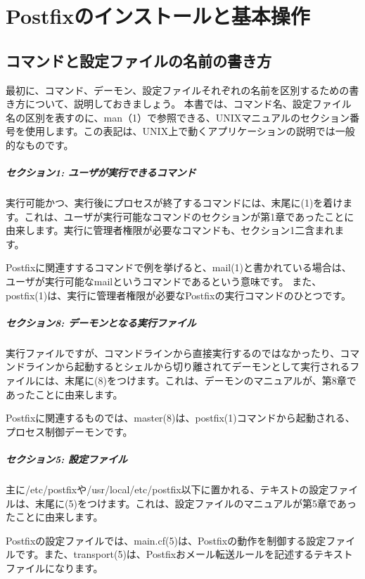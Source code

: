 \chapter{Postfixのインストールと基本操作}

\section{コマンドと設定ファイルの名前の書き方}
最初に、コマンド、デーモン、設定ファイルそれぞれの名前を区別するための書き方について、説明しておきましょう。
本書では、コマンド名、設定ファイル名の区別を表すのに、man（1）で参照できる、UNIXマニュアルのセクション番号を使用します。この表記は、UNIX上で動くアプリケーションの説明では一般的なものです。

\paragraph{セクション1: ユーザが実行できるコマンド}
実行可能かつ、実行後にプロセスが終了するコマンドには、末尾に(1)を着けます。これは、ユーザが実行可能なコマンドのセクションが第1章であったことに由来します。実行に管理者権限が必要なコマンドも、セクション1二含まれます。

Postfixに関連すするコマンドで例を挙げると、mail(1)と書かれている場合は、ユーザが実行可能なmailというコマンドであるという意味です。
また、postfix(1)は、実行に管理者権限が必要なPostfixの実行コマンドのひとつです。

\paragraph{セクション8: デーモンとなる実行ファイル}
実行ファイルですが、コマンドラインから直接実行するのではなかったり、コマンドラインから起動するとシェルから切り離されてデーモンとして実行されるファイルには、末尾に(8)をつけます。これは、デーモンのマニュアルが、第8章であったことに由来します。

Postfixに関連するものでは、master(8)は、postfix(1)コマンドから起動される、プロセス制御デーモンです。

\paragraph{セクション5: 設定ファイル}
主に/etc/postfixや/usr/local/etc/postfix以下に置かれる、テキストの設定ファイルは、末尾に(5)をつけます。これは、設定ファイルのマニュアルが第5章であったことに由来します。

Postfixの設定ファイルでは、main.cf(5)は、Postfixの動作を制御する設定ファイルです。また、transport(5)は、Postfixおメール転送ルールを記述するテキストファイルになります。

